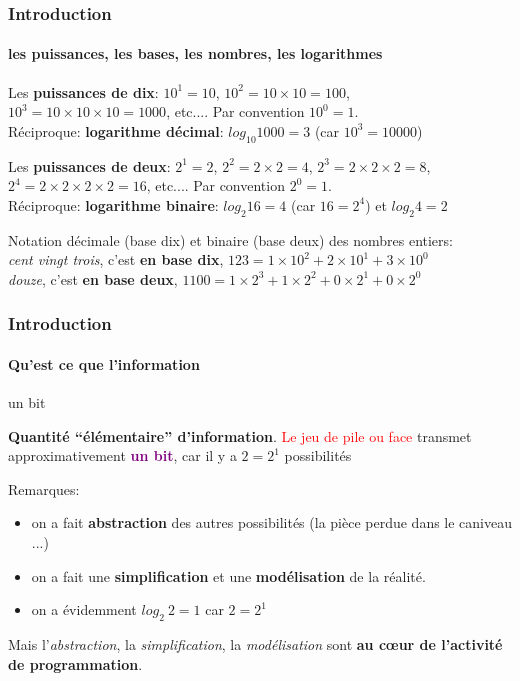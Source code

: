 \documentclass[xcolor=svgnames,final,smaller,a4]{beamer}
\begin{document}
\begin{frame}
  \frametitle{Introduction}
  \framesubtitle{les puissances, les bases, les nombres, les logarithmes}

  Les \textbf{puissances de dix}: $10^1 = 10$, $10^2 = 10 \times 10 = 100$,
  $10^3 = 10 \times 10 \times 10 = 1000$, etc.... Par convention $10^0 = 1$. \\
  Réciproque: \textbf{logarithme décimal}: $log_{10} 1000 = 3$ (car $10^3 = 10000$)

  \vspace{0.5cm}
  
  Les  \textbf{puissances de deux}: $2^1 = 2$, $2^2 = 2 \times 2 = 4$, $2^3 = 2 \times 2 \times 2 = 8$, $2^4 = 2 \times 2 \times 2  \times 2 = 16$, etc.... Par convention $2^0 = 1$. \\ Réciproque: \textbf{logarithme binaire}: $log_2 16 = 4$ (car $16 = 2^4$) et $log_2 4 = 2$

  \vspace{0.5cm}

  Notation décimale (base dix) et binaire (base deux) des nombres entiers: \\
  \emph{cent vingt trois}, c'est \textbf{en base dix}, $123 = 1 \times 10^2 + 2 \times 10^1 + 3 \times 10^0$ \\
  \emph{douze}, c'est \textbf{en base deux}, $1100 = 1 \times 2^3 + 1 \times 2^2 + 0 \times 2^1 + 0 \times 2^0$
\end{frame}


\begin{frame}
  \frametitle{Introduction}
  \framesubtitle{Qu'est ce que l'information}

  \begin{block}{un bit}

    \textbf{Quantité ``élémentaire'' d'information}. \textcolor{red}{Le jeu de pile ou face} transmet approximativement \textcolor{purple}{\textbf{un bit}}, car il y a $2 = 2^1$ possibilités
    
  \end{block}

  Remarques:
  \begin{itemize}
  \item on a fait \textbf{abstraction} des autres possibilités (la pièce perdue dans le caniveau ...)
  \item on a fait une \textbf{simplification} et une \textbf{modélisation} de la réalité.
    \item on a évidemment $log_2 ~ 2 = 1$ car $2 = 2^1$
  \end{itemize}

  Mais l'\emph{abstraction}, la \emph{simplification}, la \emph{modélisation} sont \textbf{au c{\oe}ur de l'activité de programmation}.
  
\end{frame}
\end{document}

